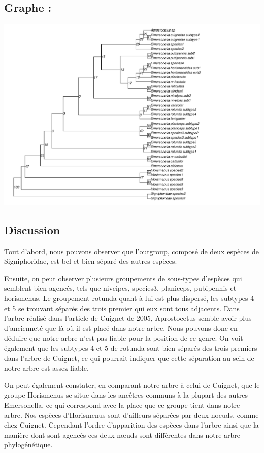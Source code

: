 \documentclass[a4paper, 11pt]{article}
\begin{document}
\subsection{Graphe :}

\includegraphics[width = 1\textwidth]{plot_Eulo_Cyt_b_PhyML_GTR_modified.pdf}
\subsection{Discussion}
Tout d’abord, nous pouvons observer que l’outgroup, composé de deux espèces de Signiphoridae, est bel et bien séparé des autres espèces.


Ensuite, on peut observer plusieurs groupements de sous-types d’espèces qui semblent bien agencés, tels que niveipes, species3, planiceps, pubipennis et horismenus. Le groupement rotunda quant à lui est plus dispersé, les subtypes 4 et 5 se trouvant séparés des trois premier qui eux sont tous adjacents. Dans l’arbre réalisé dans l’article de Cuignet de 2005, Aprostocetus semble avoir plus d’ancienneté que là où il est placé dans notre arbre. Nous pouvons donc en déduire que notre arbre n’est pas fiable pour la position de ce genre. On voit également que les subtypes 4 et 5 de rotunda sont bien séparés des trois premiers dans l’arbre de Cuignet, ce qui pourrait indiquer que cette séparation au sein de notre arbre est assez fiable. 


On peut également constater, en comparant notre arbre à celui de Cuignet, que le groupe Horismenus se situe dans les ancêtres communs à la plupart des autres Emersonella, ce qui correspond avec la place que ce groupe tient dans notre arbre. Nos espèces d’Horismenus sont d’ailleurs séparées par deux noeuds, comme chez Cuignet. Cependant l’ordre d’apparition des espèces dans l’arbre ainsi que la manière dont sont agencés ces deux nœuds sont différentes dans notre arbre phylogénétique.
\end{document}
